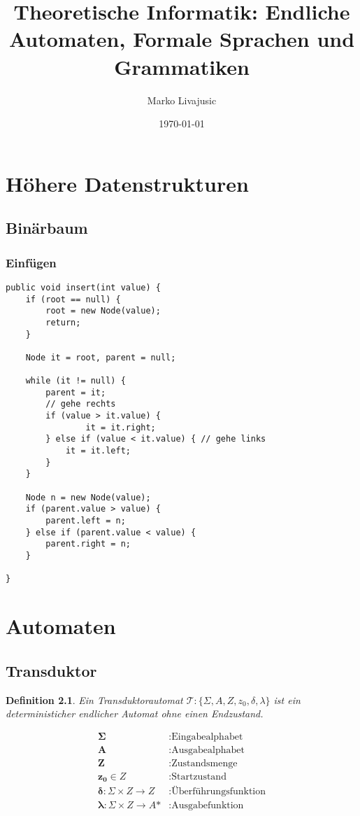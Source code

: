 \documentclass[12pt, oneside]{book}
\author{Marko Livajusic}
\date{\today}
\title{Theoretische Informatik: Endliche Automaten, Formale Sprachen und Grammatiken}
\newtheorem{definition}{Definition}
\begin{document}
\maketitle
\tableofcontents
\cleardoublepage
\chapter{Höhere Datenstrukturen}
\section{Binärbaum}
\subsection{Einfügen}
\begin{lstlisting}
public void insert(int value) {
    if (root == null) {
        root = new Node(value);
        return;
    }
            
    Node it = root, parent = null;
            
    while (it != null) {
        parent = it;
        // gehe rechts
        if (value > it.value) {
                it = it.right;
        } else if (value < it.value) { // gehe links
            it = it.left;
        }
    }
                    
    Node n = new Node(value);
    if (parent.value > value) {
        parent.left = n;
    } else if (parent.value < value) {
        parent.right = n;
    }
                            
}
\end{lstlisting}
\chapter{Automaten}
\section{Transduktor}
\begin{definition}
Ein Transduktorautomat $\mathcal{T}: \{\Sigma, A, Z, z_{0}, \delta, \lambda\}$ ist ein deterministicher endlicher Automat ohne einen Endzustand.
\end{definition}
\begin{align*}
    \mathbf{\Sigma} &: \text{Eingabealphabet}\\
    \mathbf{A} &: \text{Ausgabealphabet}\\
    \mathbf{Z} &: \text{Zustandsmenge}\\
    \mathbf{z_{0}} \in Z &: \text{Startzustand}\\
    \mathbf{\delta }: \Sigma \times Z \rightarrow Z &: \text{Überführungsfunktion}\\
    \mathbf{\lambda }: \Sigma \times Z \rightarrow A\text{*} &: \text{Ausgabefunktion}
\end{align*}
\end{document}
